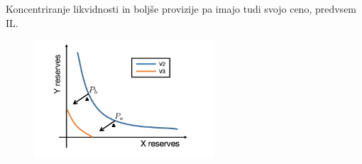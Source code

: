 \documentclass[a4paper,12pt]{article}%
\begin{document}
Koncentriranje likvidnosti in boljše provizije pa imajo tudi svojo ceno, predvsem IL. 




\begin{figure}[!ht]
    \centering
    \includegraphics[width=0.6\textwidth]{krivulja.png}
\end{figure}






\end{document}

